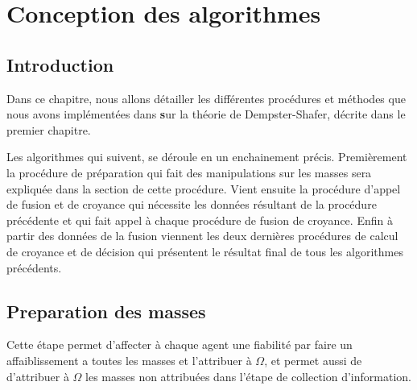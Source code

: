 \chapter{Conception des algorithmes}

{}
\section*{Introduction}

Dans ce chapitre, nous allons détailler les différentes procédures et méthodes que nous avons implémentées dans \textbf sur la théorie de Dempster-Shafer, décrite dans le premier chapitre.

Les algorithmes qui suivent, se déroule en un enchainement précis.
Premièrement la procédure de préparation qui fait des manipulations sur les masses sera expliquée dans la section de cette procédure. Vient ensuite la procédure d'appel de fusion et de croyance qui nécessite les données résultant de la procédure précédente et qui fait appel à chaque procédure de fusion de croyance. Enfin à partir des données de la fusion viennent les deux dernières procédures de calcul de croyance et de décision qui présentent le résultat final de tous les algorithmes précédents.

\DontPrintSemicolon
\section{Preparation des masses}
Cette étape permet d'affecter à chaque agent une fiabilité par faire un affaiblissement a toutes les masses et l'attribuer à $\Omega$, et permet aussi de d'attribuer à $\Omega$ les masses non attribuées dans l'étape de collection d'information.   

